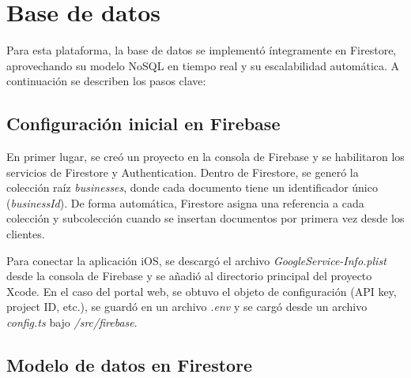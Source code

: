 
\section{Base de datos}

\begin{large}

Para esta plataforma, la base de datos se implementó íntegramente en Firestore, aprovechando su modelo NoSQL en tiempo real y su escalabilidad automática. A continuación se describen los pasos clave:

\end{large}

\subsection{Configuración inicial en Firebase}

\begin{large}

En primer lugar, se creó un proyecto en la consola de Firebase y se habilitaron los servicios de Firestore y Authentication. Dentro de Firestore, se generó la colección raíz \textit{businesses}, donde cada documento tiene un identificador único (\textit{businessId}). De forma automática, Firestore asigna una referencia a cada colección y subcolección cuando se insertan documentos por primera vez desde los clientes.

Para conectar la aplicación iOS, se descargó el archivo \textit{GoogleService-Info.plist} desde la consola de Firebase y se añadió al directorio principal del proyecto Xcode. En el caso del portal web, se obtuvo el objeto de configuración (API key, project ID, etc.), se guardó en un archivo \textit{.env} y se cargó desde un archivo \textit{config.ts} bajo \textit{/src/firebase}.

\end{large}

\subsection{Modelo de datos en Firestore}

